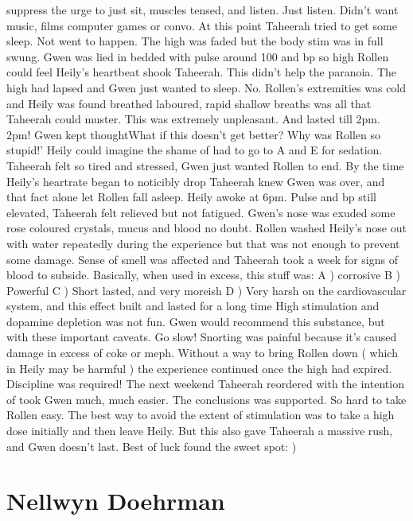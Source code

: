 \documentclass[12pt]{book}
\begin{document}
suppress the urge to just sit, muscles tensed, and listen. Just listen. Didn't want music, films computer games or convo. At this point Taheerah tried to get some sleep. Not went to happen. The high was faded but the body stim was in full swung. Gwen was lied in bedded with pulse around 100 and bp so high Rollen could feel Heily's heartbeat shook Taheerah. This didn't help the paranoia. The high had lapsed and Gwen just wanted to sleep. No. Rollen's extremities was cold and Heily was found breathed laboured, rapid shallow breaths was all that Taheerah could muster. This was extremely unpleasant. And lasted till 2pm. 2pm! Gwen kept thoughtWhat if this doesn't get better? Why was Rollen so stupid!' Heily could imagine the shame of had to go to A and E for sedation. Taheerah felt so tired and stressed, Gwen just wanted Rollen to end. By the time Heily's heartrate began to noticibly drop Taheerah knew Gwen was over, and that fact alone let Rollen fall asleep. Heily awoke at 6pm. Pulse and bp still elevated, Taheerah felt relieved but not fatigued. Gwen's nose was exuded some rose coloured crystals, mucus and blood no doubt. Rollen washed Heily's nose out with water repeatedly during the experience but that was not enough to prevent some damage. Sense of smell was affected and Taheerah took a week for signs of blood to subside. Basically, when used in excess, this stuff was: A ) corrosive B ) Powerful C ) Short lasted, and very moreish D ) Very harsh on the cardiovascular system, and this effect built and lasted for a long time High stimulation and dopamine depletion was not fun. Gwen would recommend this substance, but with these important caveats. Go slow! Snorting was painful because it's caused damage in excess of coke or meph. Without a way to bring Rollen down ( which in Heily may be harmful ) the experience continued once the high had expired. Discipline was required! The next weekend Taheerah reordered with the intention of took Gwen much, much easier. The conclusions was supported. So hard to take Rollen easy. The best way to avoid the extent of stimulation was to take a high dose initially and then leave Heily. But this also gave Taheerah a massive rush, and Gwen doesn't last. Best of luck found the sweet spot: )



\chapter{Nellwyn Doehrman}
\end{document}
